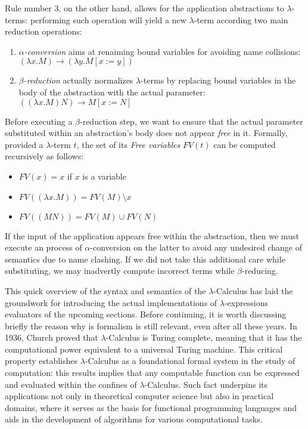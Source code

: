 \documentclass{article}
\begin{document}
Rule number 3, on the other hand, allows for the application abstractions to $\lambda$-terms: performing such operation will yield a new $\lambda$-term according two main reduction operations:

\begin{enumerate}
    \item \textit{$\alpha$-conversion} aims at renaiming bound variables for avoiding name collisions: $(\lambda x . M) \to (\lambda y . M[x := y])$
    \item \textit{$\beta$-reduction} actually normalizes $\lambda$-terms by replacing bound variables in the body of the abstraction with the actual parameter: $((\lambda x . M) N) \to M[x := N]$
\end{enumerate}

Before executing a $\beta$-reduction step, we want to ensure that the actual parameter substituted within an abstraction's body does not appear \textit{free} in it. Formally, provided a $\lambda$-term $t$, the set of its \textit{Free variables} $FV(t)$ can be computed recursively as follows:

\begin{itemize}
    \item $FV(x) = x$ if $x$ is a variable
    \item $FV((\lambda x . M)) = FV(M) \setminus x$
    \item $FV((M N)) = FV(M) \cup FV(N)$
\end{itemize}

If the input of the application appears free within the abstraction, then we must execute an process of $\alpha$-conversion on the latter to avoid any undesired change of semantics due to name clashing. If we did not take this additional care while substituting, we may inadvertly compute incorrect terms while $\beta$-reducing.

This quick overview of the syntax and semantics of the $\lambda$-Calculus has laid the groundwork for introducing the actual implementations of $\lambda$-expressions evaluators of the upcoming sections. Before continuing, it is worth discussing briefly the reason why is formalism is still relevant, even after all these years. In 1936, Church proved that $\lambda$-Calculus is Turing complete, meaning that it has the computational power equivalent to a universal Turing machine. This critical property establishes $\lambda$-Calculus as a foundational formal system in the study of computation: this results implies that any computable function can be expressed and evaluated within the confines of $\lambda$-Calculus. Such fact underpins its applications not only in theoretical computer science but also in practical domains, where it serves as the basis for functional programming languages and aids in the development of algorithms for various computational tasks.
\end{document}
